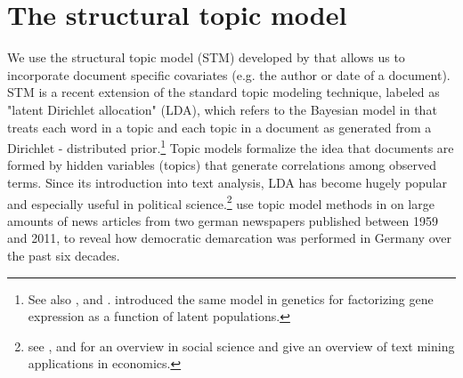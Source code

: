 \documentclass[12pt,a4paper,notitlepage]{article}
\begin{document}
\section{The structural topic model}\label{ch_model}

We use the structural topic model (STM) developed by \citet{roberts_model_2016} that allows us to incorporate document specific covariates (e.g. the author or date of a document). STM is a recent extension of the standard topic modeling technique, labeled as "latent Dirichlet allocation" (LDA), which refers to the Bayesian model in \citet{blei_latent_2003} that treats each word in a topic and each topic in a document as generated from a Dirichlet - distributed prior.\footnote{See also \citet{griffiths_probabilistic_2002}, \citet{griffiths_finding_2004} and \citet{hofmann_probabilistic_1999}. \citet{pritchard_inference_2000} introduced the same model in genetics for factorizing gene expression as a function of latent populations.} Topic models formalize the idea that documents are formed by hidden variables (topics) that generate correlations among observed terms. Since its introduction into text analysis, LDA has become hugely popular and especially useful in political science.\footnote{see \citet{blei_probabilistic_2012}, \citet{grimmer_text_2013} and \citet{wiedmann_text_2016} for an overview in social science and \citet{gentzkow_text_2017} give an overview of text mining applications in economics.} \citet{wiedmann_text_2016} use topic model methods in on large amounts of news articles from two german newspapers published between 1959 and 2011, to reveal how democratic demarcation was performed in Germany over the past six decades. 
\end{document}
